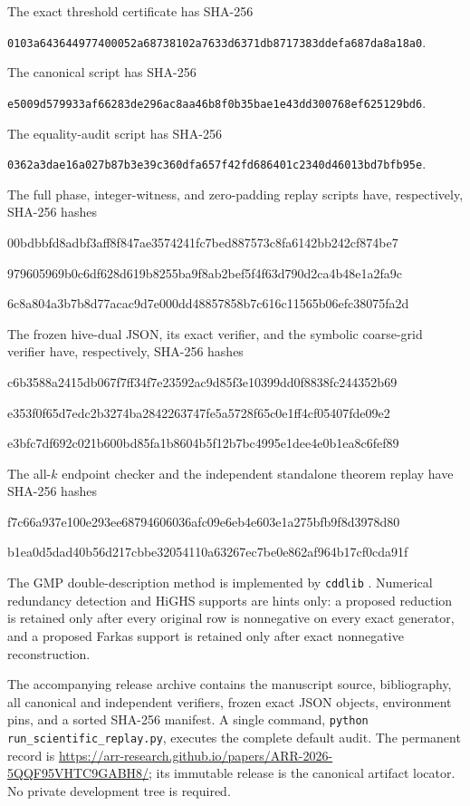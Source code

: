 \documentclass[11pt]{article}
\begin{document}
The exact threshold certificate has SHA-256
\begin{center}
\small\texttt{0103a643644977400052a68738102a7633d6371db8717383ddefa687da8a18a0}.
\end{center}
The canonical script has SHA-256
\begin{center}
\small\texttt{e5009d579933af66283de296ac8aa46b8f0b35bae1e43dd300768ef625129bd6}.
\end{center}
The equality-audit script has SHA-256
\begin{center}
\small\texttt{0362a3dae16a027b87b3e39c360dfa657f42fd686401c2340d46013bd7bfb95e}.
\end{center}
The full phase, integer-witness, and zero-padding replay scripts have,
respectively, SHA-256 hashes
\begin{center}
\scriptsize\ttfamily
00bdbbfd8adbf3aff8f847ae3574241fc7bed887573c8fa6142bb242cf874be7\par
979605969b0c6df628d619b8255ba9f8ab2bef5f4f63d790d2ca4b48e1a2fa9c\par
6c8a804a3b7b8d77acac9d7e000dd48857858b7c616c11565b06efc38075fa2d
\end{center}
The frozen hive-dual JSON, its exact verifier, and the symbolic coarse-grid
verifier have, respectively, SHA-256 hashes
\begin{center}
\scriptsize\ttfamily
c6b3588a2415db067f7ff34f7e23592ac9d85f3e10399dd0f8838fc244352b69\par
e353f0f65d7edc2b3274ba2842263747fe5a5728f65c0e1ff4cf05407fde09e2\par
e3bfc7df692c021b600bd85fa1b8604b5f12b7bc4995e1dee4e0b1ea8c6fef89
\end{center}
The all-$k$ endpoint checker and the independent standalone theorem replay
have SHA-256 hashes
\begin{center}
\scriptsize\ttfamily
f7c66a937e100e293ee68794606036afc09e6eb4e603e1a275bfb9f8d3978d80\par
b1ea0d5dad40b56d217cbbe32054110a63267ec7be0e862af964b17cf0cda91f
\end{center}
The GMP double-description method is implemented by \texttt{cddlib}
\cite{fukuda1996,cddlib}.  Numerical redundancy detection and HiGHS supports
are hints only: a proposed reduction is retained only after every original
row is nonnegative on every exact generator, and a proposed Farkas support is
retained only after exact nonnegative reconstruction.

The accompanying release archive contains the manuscript source,
bibliography, all canonical and independent verifiers, frozen exact JSON
objects, environment pins, and a sorted SHA-256 manifest.  A single command,
\texttt{python run\_scientific\_replay.py}, executes the complete default
audit.  The permanent record is
\url{https://arr-research.github.io/papers/ARR-2026-5QQF95VHTC9GABH8/}; its
immutable release is the canonical artifact locator.  No private development
tree is required.
\end{document}

